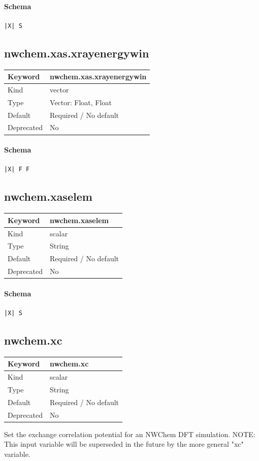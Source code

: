 \documentclass[11pt]{article}
\begin{document}
\paragraph{Schema}
\begin{Verbatim}
|X| S
\end{Verbatim}

\subsection{nwchem.xas.xrayenergywin}
\label{kw:nwchem-xas-xrayenergywin}
\begin{longtable}{|p{1.5in}|p{4.5in}|}
\hline
Keyword & nwchem.xas.xrayenergywin \\
\hline
Kind & vector \\
\hline
Type & Vector: Float, Float \\
\hline
Default & Required / No default \\
\hline
Deprecated & No \\
\hline
\end{longtable}
\paragraph{Schema}
\begin{Verbatim}
|X| F F
\end{Verbatim}

\subsection{nwchem.xaselem}
\label{kw:nwchem-xaselem}
\begin{longtable}{|p{1.5in}|p{4.5in}|}
\hline
Keyword & nwchem.xaselem \\
\hline
Kind & scalar \\
\hline
Type & String \\
\hline
Default & Required / No default \\
\hline
Deprecated & No \\
\hline
\end{longtable}
\paragraph{Schema}
\begin{Verbatim}
|X| S
\end{Verbatim}

\subsection{nwchem.xc}
\label{kw:nwchem-xc}
\begin{longtable}{|p{1.5in}|p{4.5in}|}
\hline
Keyword & nwchem.xc \\
\hline
Kind & scalar \\
\hline
Type & String \\
\hline
Default & Required / No default \\
\hline
Deprecated & No \\
\hline
\end{longtable}
 Set the exchange correlation potential for an NWChem DFT simulation.
 NOTE: This input variable will be superseded in the future by the more
 general "xc" variable.
\end{document}
